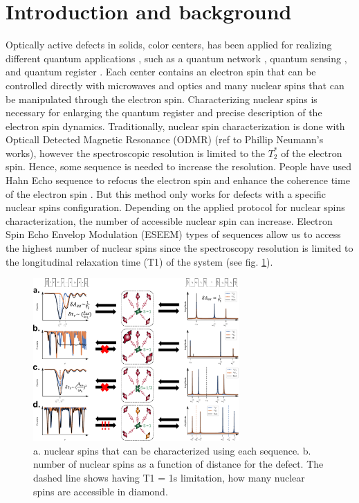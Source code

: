 \documentclass[%
 reprint,
superscriptaddress,
 amsmath,amssymb,
 aps,
]{revtex4-2}
\begin{document}
\section{Introduction and background}
Optically active defects in solids, color centers, has been applied for realizing different quantum applications \cite{awschalom2018quantum}, such as a quantum network \cite{pompili2021realization}, quantum sensing \cite{degen2017quantum}, and quantum register \cite{bradley2019ten}. Each center contains an electron spin that can be controlled directly with microwaves and optics and many nuclear spins that can be manipulated through the electron spin. Characterizing nuclear spins is necessary for enlarging the quantum register and precise description of the electron spin dynamics. Traditionally, nuclear spin characterization is done with Opticall Detected Magnetic Resonance (ODMR) (ref to Phillip Neumann's works), however the spectroscopic resolution is limited to the $T_2^\ast$ of the electron spin. Hence, some sequence is needed to increase the resolution. People have used Hahn Echo sequence to refocus the electron spin and enhance the coherence time of the electron spin \cite{childress2006coherent}. But this method only works for defects with a specific nuclear spins configuration. Depending on the applied protocol for nuclear spins characterization, the number of accessible nuclear spin can increase. Electron Spin Echo Envelop Modulation (ESEEM) types of sequences allow us to access the highest number of nuclear spins since the spectroscopy resolution is limited to the longitudinal relaxation time (T1) of the system (see fig. \ref{fig:1}). 
\begin{figure}%
	\begin{center}
		\includegraphics[width=0.7\textwidth]{pict/drawing0.pdf}
		\caption{a. nuclear spins that can be characterized using each sequence. b. number of nuclear spins as a function of distance for the defect. The dashed line shows having T1 = 1s limitation, how many nuclear spins are accessible in diamond. }
		\label{fig:1}
	\end{center}
\end{figure}
\end{document}
